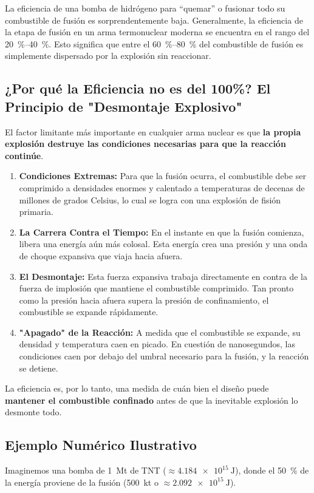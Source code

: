 \documentclass[11pt,a4paper]{article}
\begin{document}
\begin{enumerate}
La eficiencia de una bomba de hidrógeno para ``quemar'' o fusionar todo su combustible de fusión es sorprendentemente baja. Generalmente, la eficiencia de la etapa de fusión en un arma termonuclear moderna se encuentra en el rango del \SIrange{20}{40}{\percent}. Esto significa que entre el \SIrange{60}{80}{\percent} del combustible de fusión es simplemente dispersado por la explosión sin reaccionar.

\subsection*{¿Por qué la Eficiencia no es del 100\%? El Principio de "Desmontaje Explosivo"}

El factor limitante más importante en cualquier arma nuclear es que \textbf{la propia explosión destruye las condiciones necesarias para que la reacción continúe}.
\begin{enumerate}
    \item \textbf{Condiciones Extremas:} Para que la fusión ocurra, el combustible debe ser comprimido a densidades enormes y calentado a temperaturas de decenas de millones de grados Celsius, lo cual se logra con una explosión de fisión primaria.
    \item \textbf{La Carrera Contra el Tiempo:} En el instante en que la fusión comienza, libera una energía aún más colosal. Esta energía crea una presión y una onda de choque expansiva que viaja hacia afuera.
    \item \textbf{El Desmontaje:} Esta fuerza expansiva trabaja directamente en contra de la fuerza de implosión que mantiene el combustible comprimido. Tan pronto como la presión hacia afuera supera la presión de confinamiento, el combustible se expande rápidamente.
    \item \textbf{"Apagado" de la Reacción:} A medida que el combustible se expande, su densidad y temperatura caen en picado. En cuestión de nanosegundos, las condiciones caen por debajo del umbral necesario para la fusión, y la reacción se detiene.
\end{enumerate}
La eficiencia es, por lo tanto, una medida de cuán bien el diseño puede \textbf{mantener el combustible confinado} antes de que la inevitable explosión lo desmonte todo.

\subsection*{Ejemplo Numérico Ilustrativo}
Imaginemos una bomba de \SI{1}{\mega\tonne} de TNT ($\approx \SI{4.184e15}{\joule}$), donde el \SI{50}{\percent} de la energía proviene de la fusión (\SI{500}{\kilo\tonne} o $\approx \SI{2.092e15}{\joule}$).


\end{enumerate}
\end{document}
